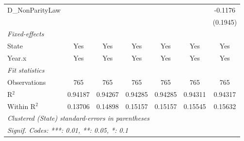 \begin{tabular}{lcccccc}
   D\_NonParityLaw                &                &                &                 &                 &                 & -0.1176\\   
                                  &                &                &                 &                 &                 & (0.1945)\\   
   \midrule
   \emph{Fixed-effects}\\
   State                          & Yes            & Yes            & Yes             & Yes             & Yes             & Yes\\  
   Year.x                         & Yes            & Yes            & Yes             & Yes             & Yes             & Yes\\  
   \midrule
   \emph{Fit statistics}\\
   Observations                   & 765            & 765            & 765             & 765             & 765             & 765\\  
   R$^2$                          & 0.94187        & 0.94267        & 0.94285         & 0.94285         & 0.94311         & 0.94317\\  
   Within R$^2$                   & 0.13706        & 0.14898        & 0.15157         & 0.15157         & 0.15545         & 0.15632\\  
   \midrule \midrule
   \multicolumn{7}{l}{\emph{Clustered (State) standard-errors in parentheses}}\\
   \multicolumn{7}{l}{\emph{Signif. Codes: ***: 0.01, **: 0.05, *: 0.1}}\\
\end{tabular}
\par\endgroup



